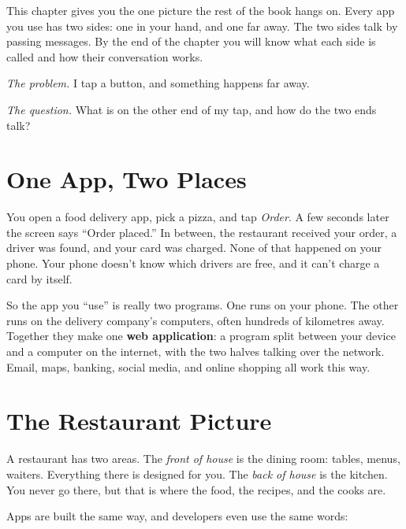 
\begin{chapterintro}

This chapter gives you the one picture the rest of the book hangs on. Every app you use has two sides: one in your hand, and one far away. The two sides talk by passing messages. By the end of the chapter you will know what each side is called and how their conversation works.

\end{chapterintro}

\emph{The problem.} I tap a button, and something happens far away.

\emph{The question.} What is on the other end of my tap, and how do the two ends talk?

\section{One App, Two Places}\label{01-two-sides-of-every-app:one-app-two-places}

You open a food delivery app, pick a pizza, and tap \emph{Order}. A few seconds later the screen says ``Order placed.'' In between, the restaurant received your order, a driver was found, and your card was charged. None of that happened on your phone. Your phone doesn't know which drivers are free, and it can't charge a card by itself.

So the app you ``use'' is really two programs. One runs on your phone. The other runs on the delivery company's computers, often hundreds of kilometres away. Together they make one \textbf{web application}: a program split between your device and a computer on the internet, with the two halves talking over the network. Email, maps, banking, social media, and online shopping all work this way.

\section{The Restaurant Picture}\label{01-two-sides-of-every-app:the-restaurant-picture}

A restaurant has two areas. The \emph{front of house} is the dining room: tables, menus, waiters. Everything there is designed for you. The \emph{back of house} is the kitchen. You never go there, but that is where the food, the recipes, and the cooks are.

Apps are built the same way, and developers even use the same words:

